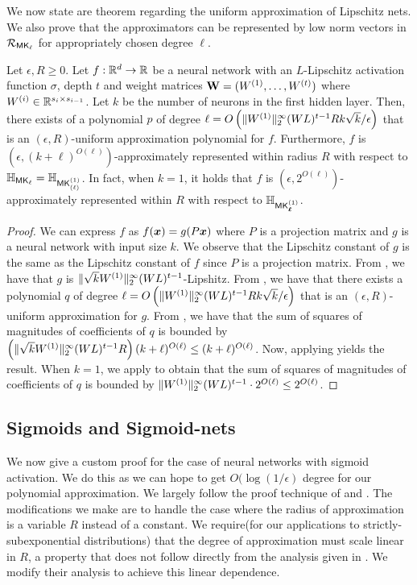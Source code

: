 We now state are theorem regarding the uniform approximation of Lipschitz nets. We also prove that the approximators can be represented by low norm vectors in $\mathcal{R}_{\mathsf{MK}_{\ell}}$ for appropriately chosen degree $\ell$.
\begin{theorem}
\label{thm:approx_lipschitz_nets}
Let $\epsilon,R\geq 0$. Let $f: \mathbb{R}^d \rightarrow \mathbb{R}$ be a neural network with an $L$-Lipschitz activation function $\sigma$, depth $t$ and weight matrices $\mathbf{W}=(W^{(1)},\ldots,W^{(t)})$ where $W^{(i)}\in \mathbb{R}^{s_i\times s_{i-1}}$. Let $k$ be the number of neurons in the first hidden layer. Then, there exists of a polynomial $p$ of degree $\ell=O\left(\|W^{(1)}\|_{2}^{\infty}(WL)^{t-1}Rk\sqrt{k}/\epsilon\right)$ that is an $(\epsilon,R)$-uniform approximation polynomial for $f$. Furthermore,  $f$ is $(\epsilon, (k+\ell)^{O(\ell)})$-approximately represented within radius $R$ with respect to ${\mathbb{H}}_{\mathsf{MK}_{\ell}}=\mathbb{H}_{\mathsf{MK}^{(1)}_{(\ell)}}$. In fact, when $k=1$, it holds that $f$ is $(\epsilon,2^{O(\ell)})$-approximately represented within $R$ with respect to $\mathbb{H}_{\mathsf{MK}_{\boldsymbol{\ell}}^{(1)}}$.
\end{theorem}
\begin{proof}
    We can express $f$ as $f({\bm{x}})=g(P{\bm{x}})$ where $P$ is a projection matrix and $g$ is a neural network with input size $k$. We observe that the Lipschitz constant of $g$ is the same as the Lipschitz constant of $f$ since $P$ is a projection matrix. 
    From , we have that $g$ is $\|\sqrt{k}W^{(1)}\|_{2}^{\infty}(WL)^{t-1}$-Lipshitz. From , we have that there exists a polynomial $q$ of degree $\ell=O\left(\|W^{(1)}\|_{2}^{\infty}(WL)^{t-1}Rk\sqrt{k}/\epsilon\right)$ that is an $(\epsilon,R)$-uniform approximation for $g$. From , we have that the sum of squares of  magnitudes of coefficients of $q$ is bounded by $\left(\|\sqrt{k}W^{(1)}\|_{2}^{\infty}(WL)^{t-1}R\right)(k+\ell)^{O(\ell)}\leq (k+\ell)^{O(\ell)}$. Now, applying  yields the result.  When $k=1$, we apply  to obtain that the sum of squares of magnitudes of coefficients of $q$ is bounded by $\|W^{(1)}\|_{2}^{\infty}(WL)^{t-1}\cdot 2^{O(\ell)}\leq 2^{O(\ell)}$.
\end{proof}
\subsection{Sigmoids and Sigmoid-nets}
\label{sec:approx_sigmoid_appendix}
We now give a custom proof for the case of neural networks with sigmoid activation. We do this as we can hope to get $O(\log(1/\epsilon)$ degree for our polynomial approximation. We largely follow the proof technique of \cite{reliable_goel2017} and \cite{zhang16}. The modifications we make are to handle the case where the radius of approximation is a variable $R$ instead of a constant. We require(for our applications to strictly-subexponential distributions) that the degree of approximation must scale linear in $R$, a property that does not follow directly from the analysis given in \cite{reliable_goel2017}. We modify their analysis to achieve this linear dependence. 

